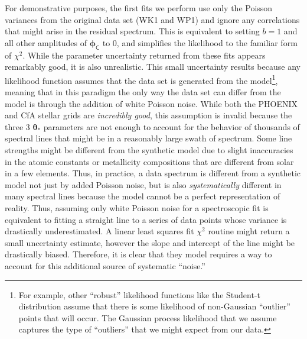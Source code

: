 \documentclass[iop,floatfix]{emulateapj}
\newcommand{\vt}{ {\bm \theta}}
\newcommand{\vp}{ {\bm \phi}}
\newcommand{\cov}{ \vp_{\mathsf{C}}}
\begin{document}
For demonstrative purposes, the first fits we perform use only the Poisson variances from the original data set (WK1 and WP1) and ignore any correlations that might arise in the residual spectrum. This is equivalent to setting $b=1$ and all other amplitudes of $\cov$ to 0, and simplifies the likelihood to the familiar form of $\chi^2$. While the parameter uncertainty returned from these fits appears remarkably good, it is also unrealistic. This small uncertainty results because any likelihood function assumes that the data set is generated from the model\footnote{For example, other ``robust'' likelihood functions like the Student-t distribution assume that there is some likelihood of non-Gaussian ``outlier'' points that will occur. The Gaussian process likelihood that we assume captures the type of ``outliers'' that we might expect from our data.}, meaning that in this paradigm the only way the data set can differ from the model is through the addition of white Poisson noise. While both the PHOENIX and CfA stellar grids are \emph{incredibly good}, this assumption is invalid because the three 3 $\vt_\ast$ parameters are not enough to account for the behavior of thousands of spectral lines that might be in a reasonably large swath of spectrum. Some line strengths might be different from the synthetic model due to slight inaccuracies in the atomic constants or metallicity compositions that are different from solar in a few elements. Thus, in practice, a data spectrum is different from a synthetic model not just by added Poisson noise, but is also \emph{systematically} different in many spectral lines because the model cannot be a perfect representation of reality. Thus, assuming only white Poisson noise for a spectroscopic fit is equivalent to fitting a straight line to a series of data points whose variance is drastically underestimated. A linear least squares fit $\chi^2$ routine might return a small uncertainty estimate, however the slope and intercept of the line might be drastically biased. Therefore, it is clear that they model requires a way to account for this additional source of systematic ``noise.'' 
\end{document}

